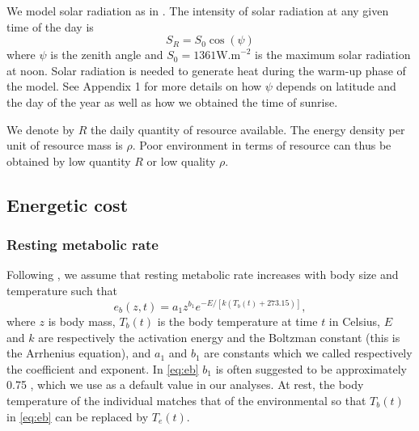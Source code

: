 We model solar radiation as in \citet{Campbell2012}. %
The intensity of solar radiation at any given time of the day is \[S_R = S_0 \cos(\psi) \]
where $\psi$ is the zenith angle and $S_0 = 1361 \mbox{W.m}^{-2}$ is the maximum solar radiation at noon. %
Solar radiation is needed to generate heat during the warm-up phase of the model.
See Appendix 1 for more details on how $\psi$ depends on latitude and the day of the year as well as how we obtained the time of sunrise. %

We denote by $R$ the daily quantity of resource available.
The energy density per unit of resource mass is $\rho$. %
Poor environment in terms of resource can thus be obtained by low quantity $R$ or low quality $\rho$.

\subsection*{Energetic cost}
\subsubsection*{Resting metabolic rate}
Following \citet{Brown2004}, we assume that resting metabolic rate increases with body size and temperature such that
\begin{equation} \label{eq:eb}
	e_b(z, t) = a_1 z^{b_1} e^{-E/[k (T_b(t)+ 273.15)]},
\end{equation}
where $z$ is body mass, $T_b(t)$ is the body temperature at time $t$ in Celsius, $E$ and $k$ are respectively the activation energy and the Boltzman constant (this is the Arrhenius equation), and $a_1$ and $b_1$ are constants which we called respectively the coefficient and exponent.
In \cref{eq:eb} $b_1$ is often suggested to be approximately 0.75 \citep{Kleiber1947, Peters1986, Brown2004}, which we use as a default value in our analyses.
At rest, the body temperature of the individual matches that of the environmental \citep[e.g.,][]{Bartholomew1978} so that $T_b(t)$ in \cref{eq:eb} can be replaced by $T_e(t)$.

